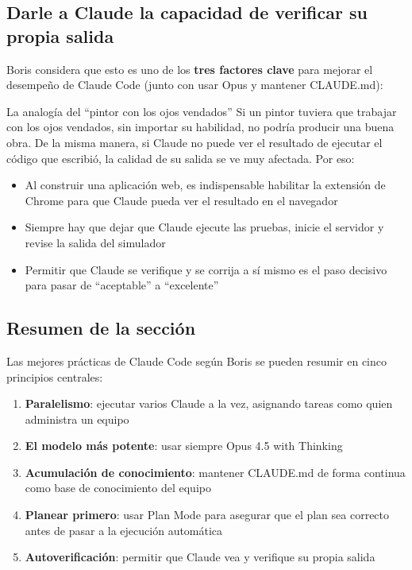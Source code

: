 \documentclass[a4paper]{article}
\begin{document}
\subsection{Darle a Claude la capacidad de verificar su propia salida}

Boris considera que esto es uno de los \textbf{tres factores clave} para mejorar el desempeño de Claude Code (junto con usar Opus y mantener CLAUDE.md):

\begin{warningbox}{La analogía del ``pintor con los ojos vendados''}
Si un pintor tuviera que trabajar con los ojos vendados, sin importar su habilidad, no podría producir una buena obra. De la misma manera, si Claude no puede ver el resultado de ejecutar el código que escribió, la calidad de su salida se ve muy afectada. Por eso:
\begin{itemize}
    \item Al construir una aplicación web, es indispensable habilitar la extensión de Chrome para que Claude pueda ver el resultado en el navegador
    \item Siempre hay que dejar que Claude ejecute las pruebas, inicie el servidor y revise la salida del simulador
    \item Permitir que Claude se verifique y se corrija a sí mismo es el paso decisivo para pasar de ``aceptable'' a ``excelente''
\end{itemize}
\end{warningbox}

\subsection{Resumen de la sección}

Las mejores prácticas de Claude Code según Boris se pueden resumir en cinco principios centrales:
\begin{enumerate}
    \item \textbf{Paralelismo}: ejecutar varios Claude a la vez, asignando tareas como quien administra un equipo
    \item \textbf{El modelo más potente}: usar siempre Opus 4.5 with Thinking
    \item \textbf{Acumulación de conocimiento}: mantener CLAUDE.md de forma continua como base de conocimiento del equipo
    \item \textbf{Planear primero}: usar Plan Mode para asegurar que el plan sea correcto antes de pasar a la ejecución automática
    \item \textbf{Autoverificación}: permitir que Claude vea y verifique su propia salida
\end{enumerate}
\end{document}
